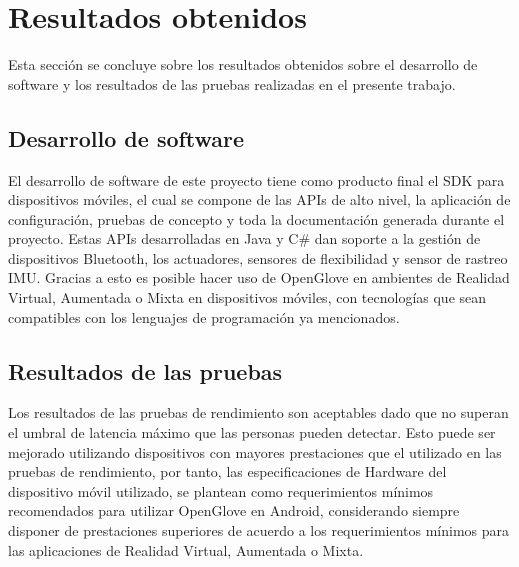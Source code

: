 \section{Resultados obtenidos}
Esta sección se concluye sobre los resultados obtenidos sobre el desarrollo de software y los resultados de las pruebas realizadas en el presente trabajo.

\subsection{Desarrollo de software}
El desarrollo de software de este proyecto tiene como producto final el SDK para dispositivos móviles, el cual se compone de las APIs de alto nivel, la aplicación de configuración, pruebas de concepto y toda la documentación generada durante el proyecto. Estas APIs desarrolladas en Java y C\# dan soporte a la gestión de dispositivos Bluetooth, los actuadores, sensores de flexibilidad  y sensor de rastreo IMU. Gracias a esto es posible hacer uso de OpenGlove en ambientes de Realidad Virtual, Aumentada o Mixta en dispositivos móviles, con tecnologías que sean compatibles con los lenguajes de programación ya mencionados.

\subsection{Resultados de las pruebas}
	
	Los resultados de las pruebas de rendimiento son aceptables dado que no superan el umbral de latencia máximo que las personas pueden detectar. Esto puede ser mejorado utilizando dispositivos con mayores prestaciones que el utilizado en las pruebas de rendimiento, por tanto, las especificaciones de Hardware del dispositivo móvil utilizado, se plantean como requerimientos mínimos recomendados para utilizar OpenGlove en Android, considerando siempre disponer de prestaciones superiores de acuerdo a los requerimientos mínimos para las aplicaciones de Realidad Virtual, Aumentada o Mixta.
